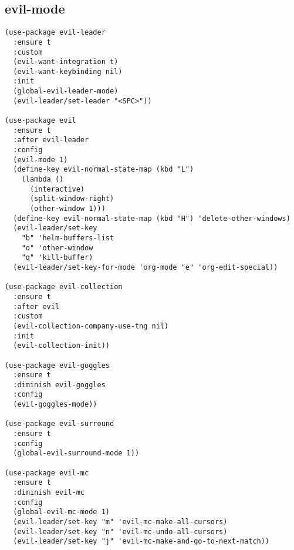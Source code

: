 \documentclass[11pt]{article}
\begin{document}
\subsection{evil-mode}
\label{sec-1-2}
\begin{verbatim}
(use-package evil-leader
  :ensure t
  :custom
  (evil-want-integration t)
  (evil-want-keybinding nil)
  :init
  (global-evil-leader-mode)
  (evil-leader/set-leader "<SPC>"))

(use-package evil 
  :ensure t
  :after evil-leader
  :config
  (evil-mode 1)
  (define-key evil-normal-state-map (kbd "L")
    (lambda () 
      (interactive)
      (split-window-right)
      (other-window 1)))
  (define-key evil-normal-state-map (kbd "H") 'delete-other-windows)
  (evil-leader/set-key
    "b" 'helm-buffers-list
    "o" 'other-window
    "q" 'kill-buffer)
  (evil-leader/set-key-for-mode 'org-mode "e" 'org-edit-special))

(use-package evil-collection
  :ensure t
  :after evil
  :custom
  (evil-collection-company-use-tng nil)
  :init
  (evil-collection-init))

(use-package evil-goggles
  :ensure t
  :diminish evil-goggles
  :config
  (evil-goggles-mode))

(use-package evil-surround
  :ensure t
  :config
  (global-evil-surround-mode 1))

(use-package evil-mc
  :ensure t
  :diminish evil-mc
  :config
  (global-evil-mc-mode 1)
  (evil-leader/set-key "m" 'evil-mc-make-all-cursors)
  (evil-leader/set-key "n" 'evil-mc-undo-all-cursors)
  (evil-leader/set-key "j" 'evil-mc-make-and-go-to-next-match))
\end{verbatim}
\end{document}
